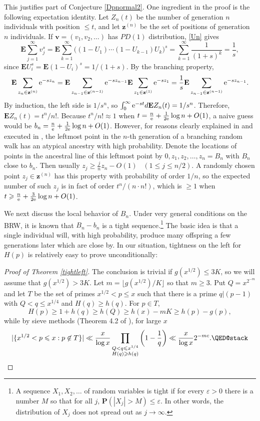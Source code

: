 \documentclass[12pt]{amsart}
\theoremstyle{remark}
\theoremstyle{plain}
\numberwithin{equation}{section}
\newcommand{\PPP}{\mathbf P}
\newcommand{\EEE}{\mathbf E}
\newcommand{\eps}{\ensuremath{\varepsilon}}
\renewcommand{\(}{\left(}
\renewcommand{\)}{\right)}
\newcommand{\zz}{\ensuremath{\mathbf{z}}}
\newcommand{\vv}{\ensuremath{\mathbf{v}}}
\newcommand{\er}{{\rm e}}  %
\renewcommand{\le}{\leqslant}
\renewcommand{\ge}{\geqslant}
\begin{document}
This justifies part of Conjecture \ref{Dpnormal2}.  One ingredient in the proof 
is the following expectation identity.
Let $Z_n(t)$ be the number of generation $n$ individuals with position $\le t$,
and let $\zz^{(n)}$ be the set of positions of generation $n$ individuals.
If $\vv=(v_1,v_2,\ldots)$ has $PD(1)$ distribution, \eqref{Un} gives
\[
\EEE \sum_{j=1}^\infty v_j^s = \EEE \sum_{k=1}^\infty \bigl( (1-U_1)
\cdots (1-U_{k-1}) U_{k} \bigr)^s 
= \sum_{k=1}^\infty \frac{1}{(1+s)^k} = \frac{1}{s},
\]
since $\EEE U_i^s = \EEE (1-U_i)^s=1/(1+s)$.
By the branching property,
\[
\EEE \sum_{z_n\in \zz^{(n)}} \er^{-s z_{n}} =
\EEE \sum_{z_{n-1}\in \zz^{(n-1)}} \er^{-s z_{n-1}}
\EEE \sum_{z_1\in \zz^{(1)}} \er^{-s z_1} 
=\frac{1}{s} \EEE \sum_{z_{n-1}\in\zz^{(n-1)}} \er^{-s z_{n-1}}.
\]
By induction, the left side is $1/s^n$, so $\int_0^\infty \er^{-st}
d \EEE Z_n(t)=1/s^n$.  Therefore, $\EEE Z_n(t)=t^n/n!$.
Because  $t^n/n! \approx 1$ 
when $t=\frac{n}{\er} + \frac{1}{2\er}\log n + O(1)$, a naive
guess would be $b_n=\frac{n}{\er} + \frac{1}{2\er}\log n + O(1)$.
However, for reasons clearly explained in \cite{ABR} and executed in
\cite{ABF}, the leftmost
point in the $n$-th generation of a branching random walk has an
atypical ancestry with high probability.
Denote the locations of points in the ancestral line
of this leftmost point by $0,z_1,z_2,\ldots,z_n=B_n$ with $B_n$ close
to $b_n$.  Then usually
$z_j \ge \frac{j}{n} z_n - O(1)$ \ $(1\le j\le n/2)$.
A randomly chosen point $z_j\in \zz^{(n)}$ has this property
with probability of order $1/n$, so the expected number of such $z_j$
is in fact of order $t^n/(n\cdot n!)$, which is $\ge 1$ when $t\ge \frac{n}{\er} + \frac{3}{2\er}\log n + O(1)$.


We next discuss the local behavior of $B_n$.  Under very general
conditions on the BRW, it is known that $B_n-b_n$ is a tight
sequence.\footnote{A sequence $X_1, X_2, \ldots$ of random variables 
is tight if for every $\eps>0$ there is a number $M$ so that for all $j$,
$\PPP(|X_j|>M)\le \eps$.  In other words, the distribution of $X_j$
does not spread out as $j\to \infty$.}
The basic idea is that a single individual
will, with high probability, produce many offspring a few
generations later which are close by.
In our situation, tightness on the left for $H(p)$ is relatively easy to
prove unconditionally:

\begin{proof}[Proof of Theorem \ref{tightleft}]
The conclusion is trivial if $g(x^{1/2}) \le 3K$, so we will assume
that  $g(x^{1/2}) > 3K$. Let
$m=\lfloor g(x^{1/2})/K \rfloor$
so that $m\ge 3$.  Put $Q=x^{2^{-m}}$ and let
 $T$ be the set of primes $x^{1/2} < p\le x$ such that there is a prime
$q|(p-1)$ with $Q < q \le x^{1/4}$ and $H(q)\ge h(q)$.
For $p\in T$,
$$
H(p) \ge 1 + h(q) \ge h(Q) \ge h(x)-mK \ge h(p)-g(p),
$$
while by sieve methods (Theorem 4.2 of \cite{HR}), for large $x$
\[
| \{ x^{1/2} < p\le x: p\not\in T \}| \ll \frac{x}{\log x}
\prod_{\substack{Q < q \le x^{1/4} \\ H(q) \ge h(q)}} \(
  1-\frac{1}{q}\) \ll \frac{x}{\log x} 2^{-mc}.
\qedhere\]
\end{proof}
\end{document}
